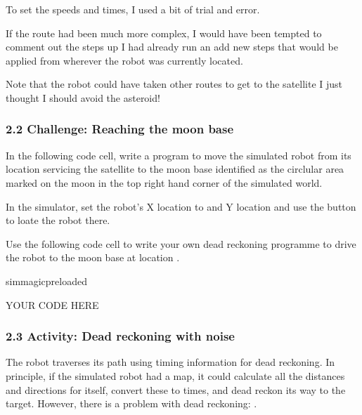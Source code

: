 \documentclass[letterpaper,10pt,english]{sphinxmanual}
\begin{document}
{To set the speeds and times, I used a bit of trial and error.

If the route had been much more complex, I would have been tempted to comment out the steps up I had already run an add new steps that would be applied from wherever the robot was currently located.

Note that the robot could have taken other routes to get to the satellite \sphinxhyphen{} I just thought I should avoid the asteroid!


\subsubsection{2.2 Challenge: Reaching the moon base}
\label{\detokenize{content/03_Robot_Lab/Section_00_02:2.2-Challenge:-Reaching-the-moon-base}}
In the following code cell, write a program to move the simulated robot from its location servicing the satellite to the moon base identified as the circlular area marked on the moon in the top right hand corner of the simulated world.

In the simulator, set the robot’s X location to  and Y location  and use the  button to loate the robot there.

Use the following code cell to write your own dead reckoning programme to drive the robot to the moon base at location .

{
\begin{sphinxVerbatim}[commandchars=\\\{\}]
\llap{\color{nbsphinxin}[ ]:\,\hspace{\fboxrule}\hspace{\fboxsep}}\PYGZpc{}\PYGZpc{}sim\PYGZus{}magic\PYGZus{}preloaded

\PYGZsh{} YOUR CODE HERE

\end{sphinxVerbatim}
}


\subsubsection{2.3 Activity: Dead reckoning with noise}
\label{\detokenize{content/03_Robot_Lab/Section_00_02:2.3-Activity:-Dead-reckoning-with-noise}}
The robot traverses its path using timing information for dead reckoning. In principle, if the simulated robot had a map, it could calculate all the distances and directions for itself, convert these to times, and dead reckon its way to the target. However, there is a problem with dead reckoning: .

}
\end{document}
